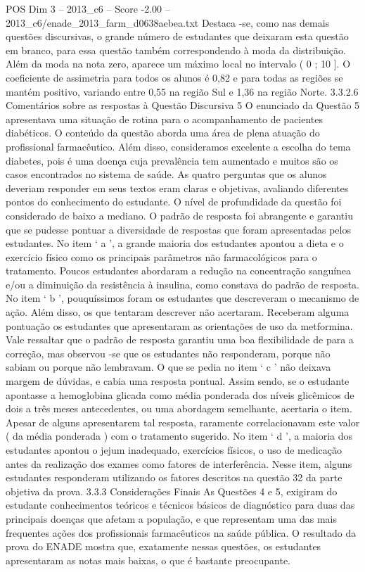 \begin{textsample}{POS Dim 3 – 2013\_c6 – Score -2.00 – 2013\_c6/enade\_2013\_farm\_d0638aebea.txt}
Destaca -se, como nas demais questões discursivas, o grande número de estudantes que deixaram esta questão em branco, para essa questão também correspondendo à moda da distribuição.
Além da moda na nota zero, aparece um máximo local no intervalo ( 0 ; 10 ].
O coeficiente de assimetria para todos os alunos é 0,82 e para todas as regiões se mantém positivo, variando entre 0,55 na região Sul e 1,36 na região Norte. 3.3.2.6 Comentários sobre as respostas à Questão Discursiva 5 O enunciado da Questão 5 apresentava uma situação de rotina para o acompanhamento de pacientes diabéticos.
O conteúdo da questão aborda uma área de plena atuação do profissional farmacêutico.
Além disso, consideramos excelente a escolha do tema diabetes, pois é uma doença cuja prevalência tem aumentado e muitos são os casos encontrados no sistema de saúde.
As quatro perguntas que os alunos deveriam responder em seus textos eram claras e objetivas, avaliando diferentes pontos do conhecimento do estudante.
O nível de profundidade da questão foi considerado de baixo a mediano.
O padrão de resposta foi abrangente e garantiu que se pudesse pontuar a diversidade de respostas que foram apresentadas pelos estudantes.
No item ‘ a ’, a grande maioria dos estudantes apontou a dieta e o exercício físico como os principais parâmetros não farmacológicos para o tratamento.
Poucos estudantes abordaram a redução na concentração sanguínea e/ou a diminuição da resistência à insulina, como constava do padrão de resposta.
No item ‘ b ’, pouquíssimos foram os estudantes que descreveram o mecanismo de ação.
Além disso, os que tentaram descrever não acertaram.
Receberam alguma pontuação os estudantes que apresentaram as orientações de uso da metformina.
Vale ressaltar que o padrão de resposta garantiu uma boa flexibilidade de para a correção, mas observou -se que os estudantes não responderam, porque não sabiam ou porque não lembravam.
O que se pedia no item ‘ c ’ não deixava margem de dúvidas, e cabia uma resposta pontual.
Assim sendo, se o estudante apontasse a hemoglobina glicada como média ponderada dos níveis glicêmicos de dois a três meses antecedentes, ou uma abordagem semelhante, acertaria o item.
Apesar de alguns apresentarem tal resposta, raramente correlacionavam este valor ( da média ponderada ) com o tratamento sugerido.
No item ‘ d ’, a maioria dos estudantes apontou o jejum inadequado, exercícios físicos, o uso de medicação antes da realização dos exames como fatores de interferência.
Nesse item, alguns estudantes responderam utilizando os fatores descritos na questão 32 da parte objetiva da prova. 3.3.3 Considerações Finais As Questões 4 e 5, exigiram do estudante conhecimentos teóricos e técnicos básicos de diagnóstico para duas das principais doenças que afetam a população, e que representam uma das mais frequentes ações dos profissionais farmacêuticos na saúde pública.
O resultado da prova do ENADE mostra que, exatamente nessas questões, os estudantes apresentaram as notas mais baixas, o que é bastante preocupante.

\end{textsample}
